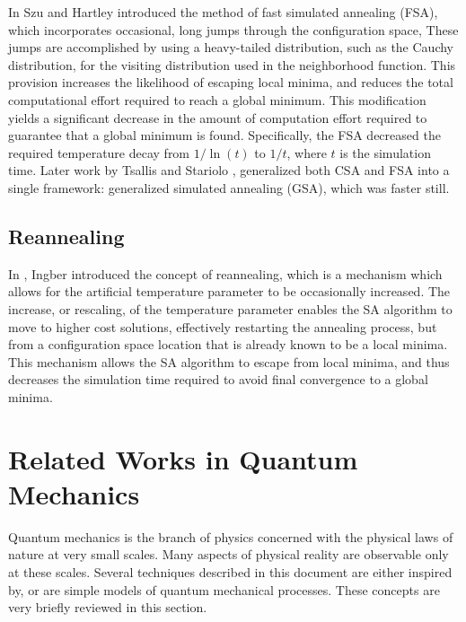 \documentclass[11pt]{afthesis}
\begin{document}
	In \cite{szu1987fastsimulatedannealing} Szu and Hartley introduced the method of fast simulated annealing (FSA), which incorporates occasional, long jumps through the configuration space, These jumps are accomplished by using a heavy-tailed distribution, such as the Cauchy distribution, for the visiting distribution used in the neighborhood function. This provision increases the likelihood of escaping local minima, and reduces the total computational effort required to reach a global minimum. This modification yields a significant decrease in the amount of computation effort required to guarantee that a global minimum is found. Specifically, the FSA decreased the required temperature decay from $1/\ln(t)$ to $1/t$, where $t$ is the simulation time. Later work by Tsallis and Stariolo \cite{tsallis1996generalizedsimulatedannealing}, generalized both CSA and FSA into a single framework: generalized simulated annealing (GSA), which was faster still.
	
	\subsection{Reannealing}
	
	In \cite{ingber1989veryfastsimulatedreannealing}, Ingber introduced the concept of reannealing, which is a mechanism which allows for the artificial temperature parameter to be occasionally increased. The increase, or rescaling, of the temperature parameter enables the SA algorithm to move to higher cost solutions, effectively restarting the annealing process, but from a configuration space location that is already known to be a local minima. This mechanism allows the SA algorithm to escape from local minima, and thus decreases the simulation time required to avoid final convergence to a global minima.
	
	\section{Related Works in Quantum Mechanics}
	
	Quantum mechanics is the branch of physics concerned with the physical laws of nature at very small scales. Many aspects of physical reality are observable only at these scales. Several techniques described in this document are either inspired by, or are simple models of quantum mechanical processes. These concepts are very briefly reviewed in this section. 
	
\end{document}
